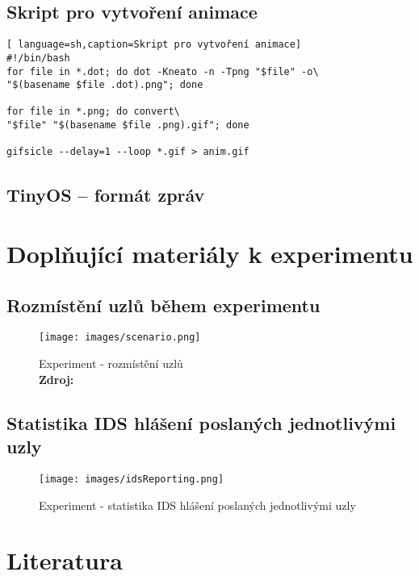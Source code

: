 \documentclass[11pt,final,twoside]{fithesis2}
\newcommand*{\captionsource}[2]{%
  \caption[{#1}]{%
    #1%
    \\\hspace{\linewidth}%
    \textbf{Zdroj:} #2%
  }%
}
\begin{document}
\section{Skript pro vytvoření animace}\label{sec:script}
\begin{lstlisting}[ language=sh,caption=Skript pro vytvoření animace]
#!/bin/bash
for file in *.dot; do dot -Kneato -n -Tpng "$file" -o\
"$(basename $file .dot).png"; done

for file in *.png; do convert\
"$file" "$(basename $file .png).gif"; done

gifsicle --delay=1 --loop *.gif > anim.gif

\end{lstlisting}


\section{TinyOS -- formát zpráv} \label{sec:msg}


\chapter{Doplňující materiály k experimentu}

\section{Rozmístění uzlů během experimentu}
\begin{figure}[h]
     \centering
     \texttt{[image: images/scenario.png]}
     \captionsource{Experiment - rozmístění uzlů}{\cite{Svenda2014}}
     \label{img:scenario}
\end{figure}

\newpage
\section{Statistika IDS hlášení poslaných jednotlivými uzly }
\begin{figure}[h]
     \centering
     \texttt{[image: images/idsReporting.png]}
     \caption{Experiment - statistika IDS hlášení poslaných jednotlivými uzly}
     \label{img:reporting}
\end{figure}





\begingroup
\def\tmpchapter{0}
\renewcommand{\chaptername}{}
\renewcommand{\thechapter}{}
\chapter{Literatura}
\renewcommand{\chapter}[2]{}%




\endgroup



\end{document}
